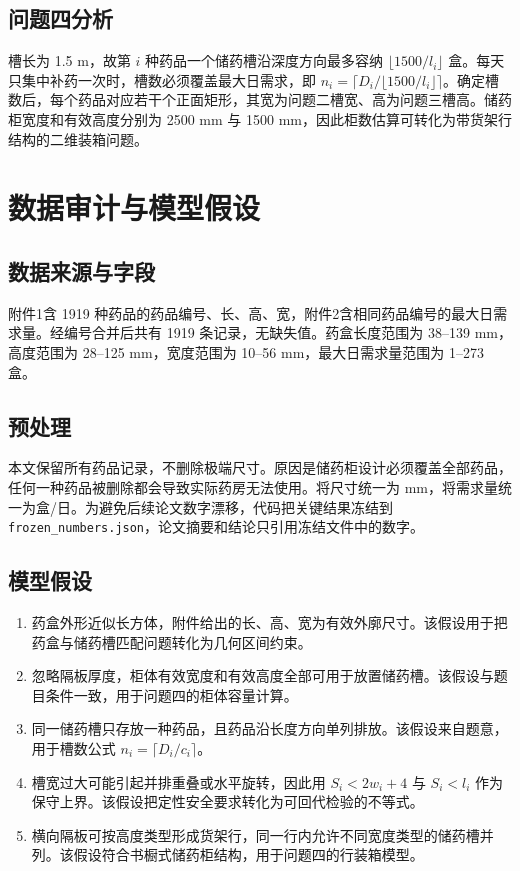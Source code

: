 \documentclass[UTF8,a4paper,12pt]{ctexart}
\begin{document}
\subsection{问题四分析}
槽长为 1.5 m，故第 $i$ 种药品一个储药槽沿深度方向最多容纳 $\lfloor 1500/l_i\rfloor$ 盒。每天只集中补药一次时，槽数必须覆盖最大日需求，即 $n_i=\lceil D_i/\lfloor1500/l_i\rfloor\rceil$。确定槽数后，每个药品对应若干个正面矩形，其宽为问题二槽宽、高为问题三槽高。储药柜宽度和有效高度分别为 2500 mm 与 1500 mm，因此柜数估算可转化为带货架行结构的二维装箱问题。

\section{数据审计与模型假设}
\subsection{数据来源与字段}
附件1含 1919 种药品的药品编号、长、高、宽，附件2含相同药品编号的最大日需求量。经编号合并后共有 1919 条记录，无缺失值。药盒长度范围为 38--139 mm，高度范围为 28--125 mm，宽度范围为 10--56 mm，最大日需求量范围为 1--273 盒。

\subsection{预处理}
本文保留所有药品记录，不删除极端尺寸。原因是储药柜设计必须覆盖全部药品，任何一种药品被删除都会导致实际药房无法使用。将尺寸统一为 mm，将需求量统一为盒/日。为避免后续论文数字漂移，代码把关键结果冻结到 \texttt{frozen\_numbers.json}，论文摘要和结论只引用冻结文件中的数字。

\subsection{模型假设}
\begin{enumerate}
\item 药盒外形近似长方体，附件给出的长、高、宽为有效外廓尺寸。该假设用于把药盒与储药槽匹配问题转化为几何区间约束。
\item 忽略隔板厚度，柜体有效宽度和有效高度全部可用于放置储药槽。该假设与题目条件一致，用于问题四的柜体容量计算。
\item 同一储药槽只存放一种药品，且药品沿长度方向单列排放。该假设来自题意，用于槽数公式 $n_i=\lceil D_i/c_i\rceil$。
\item 槽宽过大可能引起并排重叠或水平旋转，因此用 $S_i<2w_i+4$ 与 $S_i<l_i$ 作为保守上界。该假设把定性安全要求转化为可回代检验的不等式。
\item 横向隔板可按高度类型形成货架行，同一行内允许不同宽度类型的储药槽并列。该假设符合书橱式储药柜结构，用于问题四的行装箱模型。
\end{enumerate}
\end{document}
